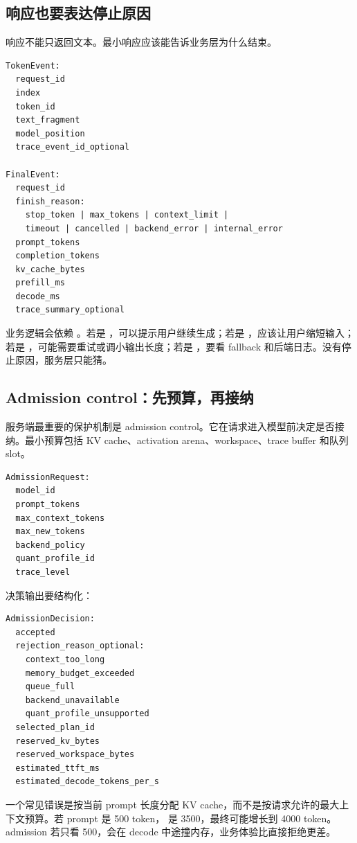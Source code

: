 \subsection{响应也要表达停止原因}

响应不能只返回文本。最小响应应该能告诉业务层为什么结束。

\begin{lstlisting}[numbers=none,caption={GenerateResponse 的业务字段}]
TokenEvent:
  request_id
  index
  token_id
  text_fragment
  model_position
  trace_event_id_optional

FinalEvent:
  request_id
  finish_reason:
    stop_token | max_tokens | context_limit |
    timeout | cancelled | backend_error | internal_error
  prompt_tokens
  completion_tokens
  kv_cache_bytes
  prefill_ms
  decode_ms
  trace_summary_optional
\end{lstlisting}

业务逻辑会依赖 。若是 ，可以提示用户继续生成；若是 ，应该让用户缩短输入；若是 ，可能需要重试或调小输出长度；若是 ，要看 fallback 和后端日志。没有停止原因，服务层只能猜。

\subsection{Admission control：先预算，再接纳}

服务端最重要的保护机制是 admission control。它在请求进入模型前决定是否接纳。最小预算包括 KV cache、activation arena、workspace、trace buffer 和队列 slot。

\begin{lstlisting}[numbers=none,caption={AdmissionRequest 字段}]
AdmissionRequest:
  model_id
  prompt_tokens
  max_context_tokens
  max_new_tokens
  backend_policy
  quant_profile_id
  trace_level
\end{lstlisting}

决策输出要结构化：

\begin{lstlisting}[numbers=none,caption={AdmissionDecision 字段}]
AdmissionDecision:
  accepted
  rejection_reason_optional:
    context_too_long
    memory_budget_exceeded
    queue_full
    backend_unavailable
    quant_profile_unsupported
  selected_plan_id
  reserved_kv_bytes
  reserved_workspace_bytes
  estimated_ttft_ms
  estimated_decode_tokens_per_s
\end{lstlisting}

一个常见错误是按当前 prompt 长度分配 KV cache，而不是按请求允许的最大上下文预算。若 prompt 是 500 token， 是 3500，最终可能增长到 4000 token。admission 若只看 500，会在 decode 中途撞内存，业务体验比直接拒绝更差。


